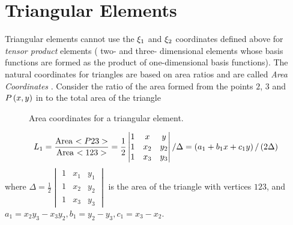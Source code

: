 
\section{Triangular Elements} 
Triangular elements cannot use the $\xi_{1}$ and $\xi_{2}$ coordinates defined 
above for \emph{tensor product} elements (\ie
two- and three- dimensional elements whose basis functions are formed as the
product of one-dimensional basis functions). The natural coordinates for
triangles are based on area ratios and are called \emph{Area Coordinates}
.  
Consider the ratio of the area formed from the points $2$, $3$ and 
 $ P\left( x,y \right) $ in  to the total area of the triangle
\begin{figure}[htbp] \centering
  
  \caption{Area coordinates for a triangular element.}
  \label{fig:areacoord}
\end{figure}

\begin{equation*}
  L_{1}=\dfrac{\text{Area $<P23>$}}{\text{Area $<123>$}}=\frac12
    \begin{vmatrix}
            1 & x & y\\
            1 & x_{2} & y_{2}\\
            1 & x_{3} & y_{3}
    \end{vmatrix}
  / \Delta = \left( a_{1} + b_{1}x + c_{1}y \right)/ \left( 2 \Delta \right)
\end{equation*}
where $ \Delta = \frac12             
    \begin{vmatrix}
            1 & x_{1} & y_{1}\\
            1 & x_{2} & y_{2}\\
            1 & x_{3} & y_{3}
    \end{vmatrix}$ 
    is the area of the triangle with vertices $123$, and $a_{1} = x_{2} y_{3}
    - x_{3} y_{2}, b_{1} = y_{2} - y_{3}, c_{1} = x_{3} - x_{2}$.

